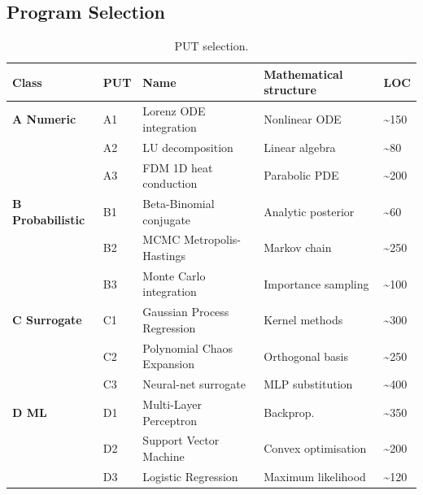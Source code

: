 \documentclass[12pt]{article}
\begin{document}
\subsection{Program Selection}\label{put-selection-12-puts-4-classes}

{\def\LTcaptype{table} %
\small
\begin{longtable}[]{@{}
  >{\raggedright\arraybackslash}p{}
  >{\raggedright\arraybackslash}p{}
  >{\raggedright\arraybackslash}p{}
  >{\raggedright\arraybackslash}p{}
  >{\raggedright\arraybackslash}p{}@{}}
\caption{PUT selection.}\label{tab:p2-02}\\
\toprule\noalign{}
\begin{minipage}[b]{\linewidth}\raggedright
Class
\end{minipage} & \begin{minipage}[b]{\linewidth}\raggedright
PUT
\end{minipage} & \begin{minipage}[b]{\linewidth}\raggedright
Name
\end{minipage} & \begin{minipage}[b]{\linewidth}\raggedright
Mathematical structure
\end{minipage} & \begin{minipage}[b]{\linewidth}\raggedright
LOC
\end{minipage} \\
\midrule\noalign{}
\endfirsthead
\endhead
\bottomrule\noalign{}
\endlastfoot
\textbf{A Numeric} & A1 & Lorenz ODE integration & Nonlinear ODE &
\textasciitilde150 \\
& A2 & LU decomposition & Linear algebra & \textasciitilde80 \\
& A3 & FDM 1D heat conduction & Parabolic PDE & \textasciitilde200 \\
\textbf{B Probabilistic} & B1 & Beta-Binomial conjugate & Analytic
posterior & \textasciitilde60 \\
& B2 & MCMC Metropolis-Hastings & Markov chain & \textasciitilde250 \\
& B3 & Monte Carlo integration & Importance sampling &
\textasciitilde100 \\
\textbf{C Surrogate} & C1 & Gaussian Process Regression & Kernel methods
& \textasciitilde300 \\
& C2 & Polynomial Chaos Expansion & Orthogonal basis &
\textasciitilde250 \\
& C3 & Neural-net surrogate & MLP substitution & \textasciitilde400 \\
\textbf{D ML} & D1 & Multi-Layer Perceptron & Backprop. &
\textasciitilde350 \\
& D2 & Support Vector Machine & Convex optimisation &
\textasciitilde200 \\
& D3 & Logistic Regression & Maximum likelihood & \textasciitilde120 \\
\end{longtable}
}
\end{document}
